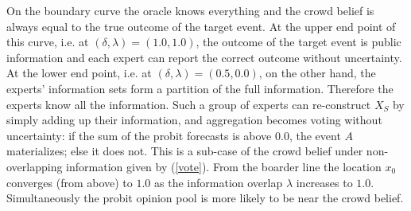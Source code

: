 \documentclass[11pt]{article}
\renewcommand{\P}{\mathbb{P}}
\newtheorem{observation}[theorem]{Observation}
\theoremstyle{definition}
\theoremstyle{definition}
\begin{document}


On the boundary curve the oracle knows everything and the crowd belief is always equal to the true outcome of the target event. 
At the upper end point of this curve, i.e. at $(\delta, \lambda) = (1.0, 1.0)$, the outcome of the target event is public information and each expert can report the correct outcome without uncertainty. At the lower end point, i.e. at $(\delta, \lambda) = (0.5, 0.0)$, on the other hand, the experts' information sets form a partition of the full information. Therefore the experts know all the information. Such a group of experts can re-construct $X_S$ by simply adding up their information, and aggregation becomes voting without uncertainty: if the sum of the probit forecasts is above $0.0$, the event $A$ materializes; else it does not. This is a sub-case of the crowd belief under non-overlapping information given by (\ref{vote}). 
From the boarder line the location $x_0$ converges (from above) to $1.0$ as the information overlap $\lambda$ increases to $1.0$. Simultaneously the probit opinion pool is more likely to be near the crowd belief. 
\end{document}
